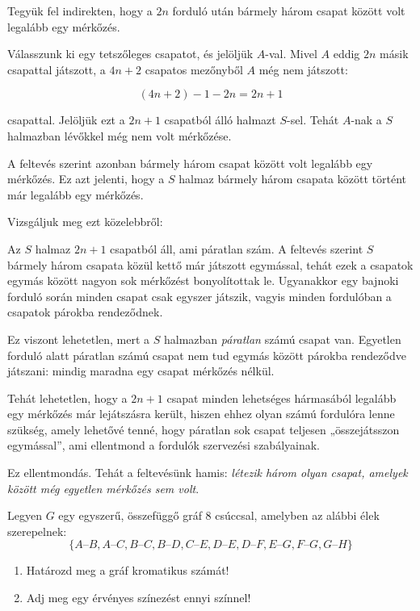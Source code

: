 \begin{solution}
	Tegyük fel indirekten, hogy a $2n$ forduló után bármely három csapat
	között volt legalább egy mérkőzés.
	
	Válasszunk ki egy tetszőleges csapatot, és jelöljük $A$-val. Mivel
	$A$ eddig $2n$ másik csapattal játszott, a $4n+2$ csapatos mezőnyből
	$A$ még nem játszott:
	
	\[
	(4n+2)-1-2n=2n+1
	\]
	
	csapattal. Jelöljük ezt a $2n+1$ csapatból álló halmazt $S$-sel.
	Tehát $A$-nak a $S$ halmazban lévőkkel még nem volt mérkőzése.
	
	A feltevés szerint azonban bármely három csapat között volt legalább
	egy mérkőzés. Ez azt jelenti, hogy a $S$ halmaz bármely három csapata
	között történt már legalább egy mérkőzés.
	
	Vizsgáljuk meg ezt közelebbről:
	
	Az $S$ halmaz $2n+1$ csapatból áll, ami páratlan szám. A feltevés
	szerint $S$ bármely három csapata közül kettő már játszott egymással,
	tehát ezek a csapatok egymás között nagyon sok mérkőzést bonyolítottak
	le. Ugyanakkor egy bajnoki forduló során minden csapat csak egyszer
	játszik, vagyis minden fordulóban a csapatok párokba rendeződnek.
	
	Ez viszont lehetetlen, mert a $S$ halmazban \emph{páratlan} számú
	csapat van. Egyetlen forduló alatt páratlan számú csapat nem tud egymás
	között párokba rendeződve játszani: mindig maradna egy csapat mérkőzés
	nélkül.
	
	Tehát lehetetlen, hogy a $2n+1$ csapat minden lehetséges hármasából
	legalább egy mérkőzés már lejátszásra került, hiszen ehhez olyan számú
	fordulóra lenne szükség, amely lehetővé tenné, hogy páratlan sok csapat
	teljesen „összejátsszon egymással”, ami ellentmond a fordulók szervezési
	szabályainak.
	
	Ez ellentmondás. Tehát a feltevésünk hamis: \emph{létezik három olyan
		csapat, amelyek között még egyetlen mérkőzés sem volt}. 
\end{solution}
\begin{extraproblem}
	Legyen $G$ egy egyszerű, összefüggő gráf 8 csúccsal, amelyben az
	alábbi élek szerepelnek: 
	\[
	\{A\text{–}B,A\text{–}C,B\text{–}C,B\text{–}D,C\text{–}E,D\text{–}E,D\text{–}F,E\text{–}G,F\text{–}G,G\text{–}H\}
	\]
	\begin{enumerate}
		\item Határozd meg a gráf kromatikus számát! 
		\item Adj meg egy érvényes színezést ennyi színnel! 
	\end{enumerate}
\end{extraproblem}

